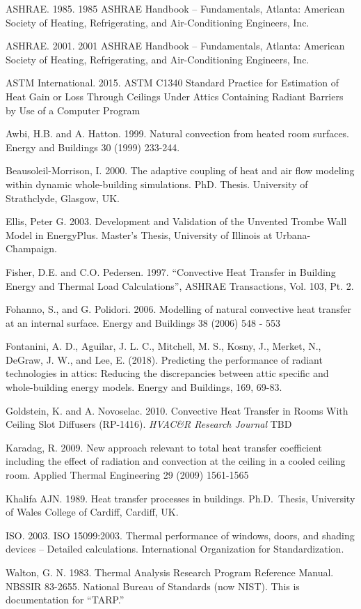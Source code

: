 ASHRAE. 1985. 1985 ASHRAE Handbook -- Fundamentals, Atlanta: American Society of Heating, Refrigerating, and Air-Conditioning Engineers, Inc.

ASHRAE. 2001. 2001 ASHRAE Handbook -- Fundamentals, Atlanta: American Society of Heating, Refrigerating, and Air-Conditioning Engineers, Inc.

ASTM International. 2015. ASTM C1340 Standard Practice for Estimation of Heat Gain or Loss Through Ceilings Under Attics Containing Radiant Barriers by Use of a Computer Program

Awbi, H.B. and A. Hatton. 1999. Natural convection from heated room surfaces. Energy and Buildings 30 (1999) 233-244.

Beausoleil-Morrison, I. 2000. The adaptive coupling of heat and air flow modeling within dynamic whole-building simulations. PhD. Thesis. University of Strathclyde, Glasgow, UK.

Ellis, Peter G. 2003. Development and Validation of the Unvented Trombe Wall Model in EnergyPlus. Master's Thesis, University of Illinois at Urbana-Champaign.

Fisher, D.E. and C.O. Pedersen. 1997. ``Convective Heat Transfer in Building Energy and Thermal Load Calculations'', ASHRAE Transactions, Vol. 103, Pt. 2.

Fohanno, S., and G. Polidori. 2006. Modelling of natural convective heat transfer at an internal surface. Energy and Buildings 38 (2006) 548 - 553

Fontanini, A. D., Aguilar, J. L. C., Mitchell, M. S., Kosny, J., Merket, N., DeGraw, J. W., and Lee, E. (2018). Predicting the performance of radiant technologies in attics: Reducing the discrepancies between attic specific and whole-building energy models. Energy and Buildings, 169, 69-83.

Goldstein, K. and A. Novoselac. 2010. Convective Heat Transfer in Rooms With Ceiling Slot Diffusers (RP-1416). \emph{HVAC\&R Research Journal} TBD

Karadag, R. 2009. New approach relevant to total heat transfer coefficient including the effect of radiation and convection at the ceiling in a cooled ceiling room. Applied Thermal Engineering 29 (2009) 1561-1565

Khalifa AJN. 1989. Heat transfer processes in buildings. Ph.D.~Thesis, University of Wales College of Cardiff, Cardiff, UK.

ISO. 2003. ISO 15099:2003. Thermal performance of windows, doors, and shading devices -- Detailed calculations. International Organization for Standardization.

Walton, G. N. 1983. Thermal Analysis Research Program Reference Manual. NBSSIR 83-2655. National Bureau of Standards (now NIST). This is documentation for ``TARP.''
